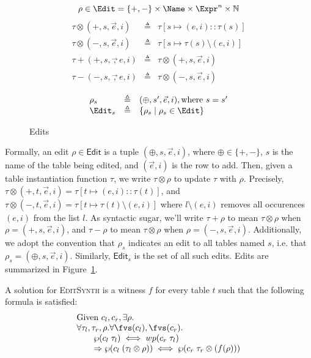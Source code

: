 \begin{figure}[pt]
  \[\rho \in \Edit = \{ +, -\} \times \Name \times \Expr^n \times \mathbb N \]
  \[\begin{array}{lcl}
      \tau \otimes (+,s,\vec e, i) & \triangleq & \tau[s \mapsto (e,i)::\tau(s)] \\
      \tau \otimes (-,s,\vec e, i) & \triangleq & \tau[s \mapsto \tau(s) \setminus (e,i)] \\
      \tau + (+, s, \vec, e, i) & \triangleq & \tau \otimes (+,s, \vec e,i) \\
      \tau - (-, s, \vec, e, i) & \triangleq & \tau \otimes (-, s, \vec e, i) 
    \end{array}\]

  \[\begin{array}{lcl}
      \rho_s & \triangleq & (\oplus, s', \vec e, i), \text{where } s = s'\\
      \Edit_s &\triangleq & \{\rho_s \mid \rho_s\in \Edit\} \\
    \end{array}\]
  \caption{Edits}
  \label{fig:edits}
\end{figure}

Formally, an edit $\rho \in \mathsf{Edit}$ is a tuple
$(\oplus,s,\vec e,i)$, where $\oplus \in \{+,-\}$, $s$ is the name of
the table being edited, and $(\vec e, i)$ is the row to add. Then,
given a table instantiation function $\tau$, we write
$\tau \otimes \rho$ to update $\tau$ with $\rho$. Precisely,
$\tau \otimes (+,t,\vec e, i) = \tau[t \mapsto (e,i)::\tau(t)]$, and
$\tau \otimes (-, t, \vec e, i) = \tau[t \mapsto \tau(t) \setminus
(e,i)]$ where $l \setminus (e,i)$ removes all occurences $(e,i)$ from
the list $l$. As syntactic sugar, we'll write $\tau + \rho$ to mean
$\tau \otimes \rho$ when $\rho = (+, s, \vec e, i)$, and $\tau - \rho$
to mean $\tau \otimes \rho$ when $\rho = (-, s, \vec e,
i)$. Additionally, we adopt the convention that $\rho_s$ indicates an
edit to all tables named $s$, i.e. that
$\rho_s = (\oplus, s, \vec e, i)$. Similarly, $\mathsf{Edit}_s$ is the
set of all such edits. Edits are summarized in Figure~\ref{fig:edits}.



A solution for \textsc{EditSynth} is a witness $f$ for every table $t$ such that
the following formula is satisfied:
\[\begin{array}{l}
    \text{Given } c_l,c_r, \exists \rho. \\
    \forall \tau_l,\tau_r,\rho. \forall \fvs(c_l), \fvs(c_r). \\
    \qquad \wp(c_l\; \tau_l) \iff wp(c_r\; \tau_l) \\
    \qquad \Rightarrow \wp(c_l\; (\tau_l \otimes \rho)) \iff \wp(c_r\; \tau_r \otimes (f(\rho)))
  \end{array}\]

